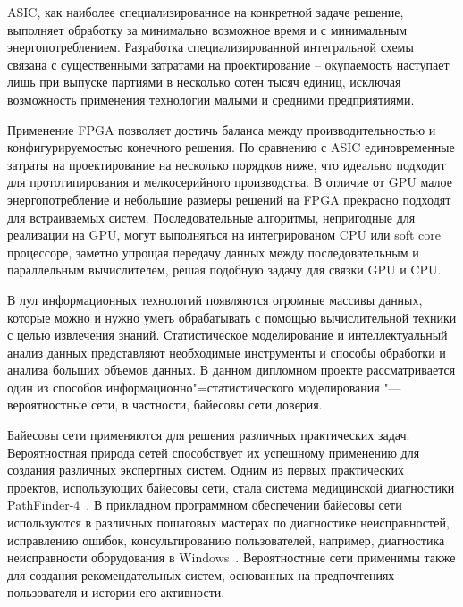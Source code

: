 ASIC, как наиболее специализированное на конкретной задаче решение,
выполняет обработку за минимально возможное время и с минимальным энергопотреблением.
Разработка специализированной интегральной схемы связана с существенными затратами
на проектирование -- окупаемость наступает лишь при выпуске партиями в несколько сотен тысяч единиц,
исключая возможность применения технологии малыми и средними предприятиями. %

Применение FPGA позволяет достичь баланса между производительностью и конфигурируемостью конечного решения.
По сравнению с ASIC единовременные затраты на проектирование на несколько порядков ниже,
что идеально подходит для прототипирования и мелкосерийного производства.%
В отличие от GPU малое энергопотребление и небольшие размеры решений на FPGA прекрасно подходят
для встраиваемых систем. %
Последовательные алгоритмы, непригодные для реализации на GPU, могут выполняться
на интегрированом CPU или soft core процессоре, заметно упрощая передачу данных
между последовательным и параллельным вычислителем, решая подобную задачу
для связки GPU и CPU.

В лул информационных технологий появляются огромные массивы данных, которые можно и нужно уметь обрабатывать с помощью вычислительной техники с целью извлечения знаний.
Статистическое моделирование и интеллектуальный анализ данных представляют необходимые инструменты и способы обработки и анализа больших объемов данных.
В данном дипломном проекте рассматривается один из способов информационно"=статистического  моделирования "--- вероятностные сети, в частности, байесовы сети доверия.

Байесовы сети применяются для решения различных практических задач.
Вероятностная природа сетей способствует их успешному применению для создания различных экспертных систем.
Одним из первых практических проектов, использующих байесовы сети, стала система медицинской диагностики PathFinder-4~\cite{terehov_2003}.
В прикладном программном обеспечении байесовы сети используются в различных пошаговых мастерах по диагностике неисправностей, исправлению ошибок, консультированию пользователей, например, диагностика неисправности оборудования в Windows~\cite{terehov_2003}.
Вероятностные сети применимы также для создания рекомендательных систем, основанных на предпочтениях пользователя и истории его активности.

